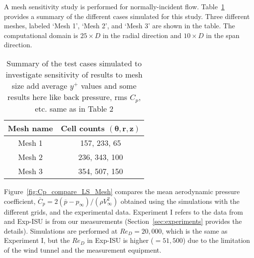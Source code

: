 %
A mesh sensitivity study is performed for normally-incident flow.
Table~\ref{tab:meshSize} provides a summary of the different cases simulated
for this study. Three different meshes, labeled `Mesh 1', `Mesh 2', and `Mesh
3' are shown in the table. The computational domain is $25\times D$ in the
radial direction and $10\times D$ in the span direction.
%
\begin{table}[htb!]
  \caption{Summary of the test cases simulated to investigate sensitivity of
    results to mesh size {\color{red} add average $y^+$ values and some results
    here like back pressure, rms $C_p$, etc. same as in Table 2}} 
  \label{tab:meshSize} 
  \begin{center}
    \begin{tabular}{c|c}
      \textbf{Mesh name} &  \textbf{Cell counts} $\boldsymbol{(\theta,r,z)}$ \\ \hline
      \hline
      Mesh 1 & 157, 233, 65\\ \hline
      Mesh 2 & 236, 343, 100\\ \hline
      Mesh 3 & 354, 507, 150\\ 
      \hline \hline
    \end{tabular}
  \end{center}
\end{table}

Figure~\ref{fig:Cp_compare_LS_Mesh} compares the mean aerodynamic pressure
coefficient, $\overline{C}_p=2 (\overline{p}-p_\infty)/(\rho V_\infty^2)$
obtained using the simulations with the different grids, and the experimental
data. Experiment I refers to the data from~\cite{norberg2013pressure} and
Exp-ISU is from our measurements (Section~\ref{sec:experiments} provides the
details). Simulations are performed at $Re_D=20,000$, which is the same as
Experiment I, but the $Re_D$ in Exp-ISU is higher ($=51,500$) due to the
limitation of the wind tunnel and the measurement equipment.

